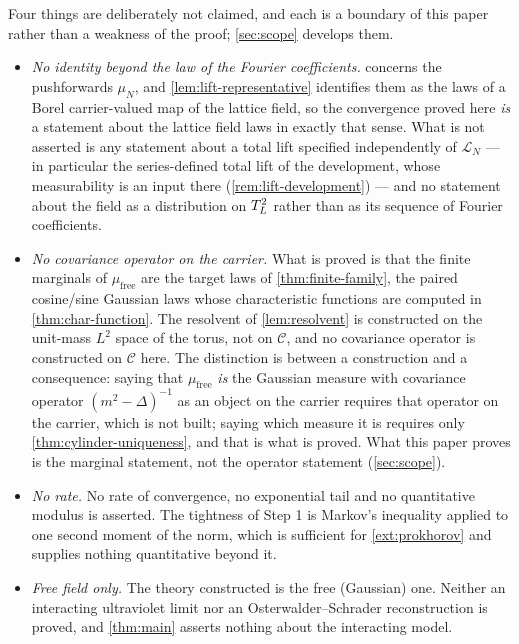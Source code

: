 Four things are deliberately not claimed, and each is a boundary of this paper
rather than a weakness of the proof; \cref{sec:scope} develops them.
\begin{itemize}
\item \emph{No identity beyond the law of the Fourier coefficients.} 
  concerns the pushforwards $\mu_N$, and \cref{lem:lift-representative} identifies
  them as the laws of a Borel carrier-valued map of the lattice field, so the
  convergence proved here \emph{is} a statement about the lattice field laws in
  exactly that sense. What is not asserted is any statement about a total lift
  specified independently of $\mathcal L_N$ --- in particular the series-defined
  total lift of the development, whose measurability is an input there
  (\cref{rem:lift-development}) --- and no statement about the field as a
  distribution on $T_L^2$ rather than as its sequence of Fourier coefficients.
\item \emph{No covariance operator on the carrier.} What is proved is that the
  finite marginals of $\mu_{\mathrm{free}}$ are the target laws of
  \cref{thm:finite-family}, the paired cosine/sine Gaussian laws whose
  characteristic functions are computed in \cref{thm:char-function}. The
  resolvent of \cref{lem:resolvent} is constructed on the unit-mass $L^2$ space
  of the torus, not on $\mathcal C$, and no covariance operator is constructed on
  $\mathcal C$ here. The distinction is between a construction and a consequence:
  saying that $\mu_{\mathrm{free}}$ \emph{is} the Gaussian measure with covariance
  operator $(m^2-\Delta)^{-1}$ as an object on the carrier requires that operator
  on the carrier, which is not built; saying which measure it is requires only
  \cref{thm:cylinder-uniqueness}, and that is what is proved. What this paper
  proves is the marginal statement, not the operator statement
  (\cref{sec:scope}).
\item \emph{No rate.} No rate of convergence, no exponential tail and no
  quantitative modulus is asserted. The tightness of Step 1 is Markov's
  inequality applied to one second moment of the norm, which is sufficient for
  \cref{ext:prokhorov} and supplies nothing quantitative beyond it.
\item \emph{Free field only.} The theory constructed is the free (Gaussian)
  one. Neither an interacting ultraviolet limit nor an Osterwalder--Schrader
  reconstruction is proved, and \cref{thm:main} asserts nothing about the
  interacting model.
\end{itemize}
